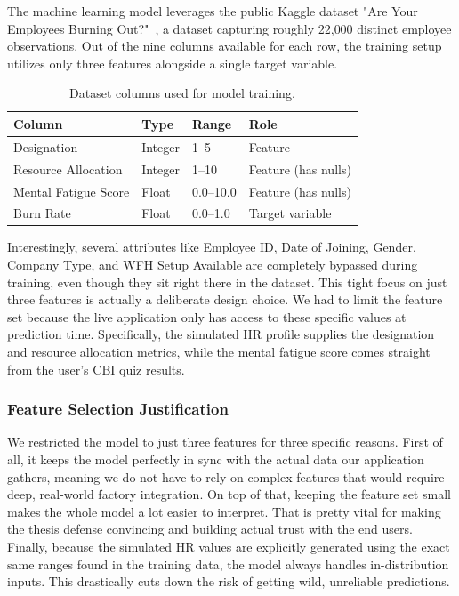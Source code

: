 \documentclass[12pt,a4paper]{article}
\begin{document}
The machine learning model leverages the public Kaggle dataset "Are Your Employees Burning Out?"~\cite{kaggle2021}, a dataset capturing roughly 22{,}000 distinct employee observations. Out of the nine columns available for each row, the training setup utilizes only three features alongside a single target variable.

\begin{table}[H]
  \centering
  \singlespacing
  \caption{Dataset columns used for model training.}
  \label{tab:dataset-columns}
  \begin{tabular}{@{}llll@{}}
    \toprule
    \textbf{Column} & \textbf{Type} & \textbf{Range} & \textbf{Role} \\
    \midrule
    Designation          & Integer & 1--5    & Feature \\
    Resource Allocation  & Integer & 1--10   & Feature (has nulls) \\
    Mental Fatigue Score & Float   & 0.0--10.0 & Feature (has nulls) \\
    Burn Rate            & Float   & 0.0--1.0  & Target variable \\
    \bottomrule
  \end{tabular}
\end{table}

Interestingly, several attributes like Employee ID, Date of Joining, Gender, Company Type, and WFH Setup Available are completely bypassed during training, even though they sit right there in the dataset. This tight focus on just three features is actually a deliberate design choice. We had to limit the feature set because the live application only has access to these specific values at prediction time. Specifically, the simulated HR profile supplies the designation and resource allocation metrics, while the mental fatigue score comes straight from the user's CBI quiz results.

\subsubsection{Feature Selection Justification}

We restricted the model to just three features for three specific reasons. First of all, it keeps the model perfectly in sync with the actual data our application gathers, meaning we do not have to rely on complex features that would require deep, real-world factory integration. On top of that, keeping the feature set small makes the whole model a lot easier to interpret. That is pretty vital for making the thesis defense convincing and building actual trust with the end users. Finally, because the simulated HR values are explicitly generated using the exact same ranges found in the training data, the model always handles in-distribution inputs. This drastically cuts down the risk of getting wild, unreliable predictions.
\end{document}
